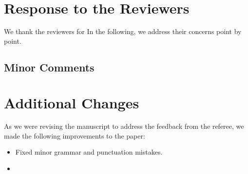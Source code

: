 \documentclass[11pt]{article}
\begin{document}
\section*{Response to the Reviewers}
We thank the reviewers for 
In the following, we address their concerns point by point.

\reviewersection

\begin{point}
	\label{pt:foo}
\end{point}

\begin{reply}
    \todo{}
\end{reply}

\subsection*{Minor Comments}


\reviewersection

\begin{point}
\end{point}

\begin{reply}
\end{reply}


\section*{Additional Changes}

As we were revising the manuscript to address the feedback from the referee, we
made the following improvements to the paper:
\begin{itemize}
    \item Fixed minor grammar and punctuation mistakes.
    \item {}
\end{itemize}
\end{document}
